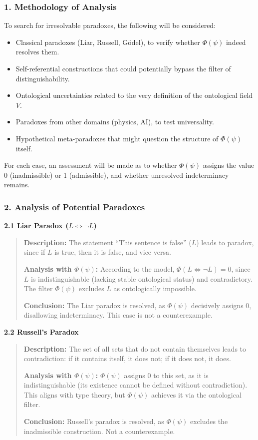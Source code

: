 \documentclass[12pt]{article}
\begin{document}
\subsubsection*{1. Methodology of Analysis}

To search for irresolvable paradoxes, the following will be considered:

\begin{itemize}
\item Classical paradoxes (Liar, Russell, Gödel), to verify whether $\Phi(\psi)$ indeed resolves them.
\item Self-referential constructions that could potentially bypass the filter of distinguishability.
\item Ontological uncertainties related to the very definition of the ontological field $V$.
\item Paradoxes from other domains (physics, AI), to test universality.
\item Hypothetical meta-paradoxes that might question the structure of $\Phi(\psi)$ itself.
\end{itemize}

For each case, an assessment will be made as to whether $\Phi(\psi)$ assigns the value 0 (inadmissible) or 1 (admissible), and whether unresolved indeterminacy remains.

\subsubsection*{2. Analysis of Potential Paradoxes}

\textbf{2.1 Liar Paradox ($L \Leftrightarrow \neg L$)}

\begin{quote}
\textbf{Description:} The statement ``This sentence is false'' ($L$) leads to paradox, since if $L$ is true, then it is false, and vice versa.

\textbf{Analysis with $\Phi(\psi)$:} According to the model, $\Phi(L \Leftrightarrow \neg L) = 0$, since $L$ is indistinguishable (lacking stable ontological status) and contradictory. The filter $\Phi(\psi)$ excludes $L$ as ontologically impossible.

\textbf{Conclusion:} The Liar paradox is resolved, as $\Phi(\psi)$ decisively assigns 0, disallowing indeterminacy. This case is not a counterexample.
\end{quote}

\textbf{2.2 Russell’s Paradox}

\begin{quote}
\textbf{Description:} The set of all sets that do not contain themselves leads to contradiction: if it contains itself, it does not; if it does not, it does.

\textbf{Analysis with $\Phi(\psi)$:} $\Phi(\psi)$ assigns 0 to this set, as it is indistinguishable (its existence cannot be defined without contradiction). This aligns with type theory, but $\Phi(\psi)$ achieves it via the ontological filter.

\textbf{Conclusion:} Russell’s paradox is resolved, as $\Phi(\psi)$ excludes the inadmissible construction. Not a counterexample.
\end{quote}
\end{document}
